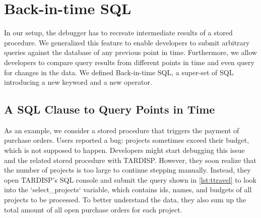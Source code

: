\documentclass[english,conference,final]{IEEEtran}
\newcommand{\tool}{TAR\-DISP}
\newcommand{\SQLextension}{Back-in-time SQL}
\begin{document}

\newcommand{\red}[1]{\textcolor{DarkRed}{#1}}
\newcommand{\gr}[1]{\textcolor{Green}{#1}}
%


\section{\SQLextension}
\label{sec:ttqueries}

In our setup, the debugger has to recreate intermediate results of a stored procedure.
We generalized this feature to enable developers to submit arbitrary queries against the database of any previous point in time.
Furthermore, we allow developers to compare query results from different points in time and even query for changes in the data.
We defined \SQLextension, a super-set of SQL introducing a new keyword and a new operator.

\subsection{A SQL Clause to Query Points in Time}

As an example, we consider a stored procedure that triggers the payment of purchase orders.
Users reported a bug: projects sometimes exceed their budget, which is not supposed to happen.
Developers might start debugging this issue and the related stored procedure with \tool.
However, they soon realize that the number of projects is too large to continue stepping manually.
Instead, they open \tool's SQL console and submit the query shown in \cref{lst:ttravel} to look into the `select_projects` variable, which contains ids, names, and budgets of all projects to be processed.
To better understand the data, they also sum up the total amount of all open purchase orders for each project.
\end{document}
